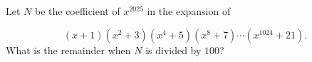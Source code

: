 Let $N$ be the coefficient of $x^{2025}$ in the expansion of

\[
(x + 1)(x^2 + 3)(x^4 + 5)(x^8 + 7) \cdots (x^{1024} + 21).
\]What is the remainder when $N$ is divided by $100$?
